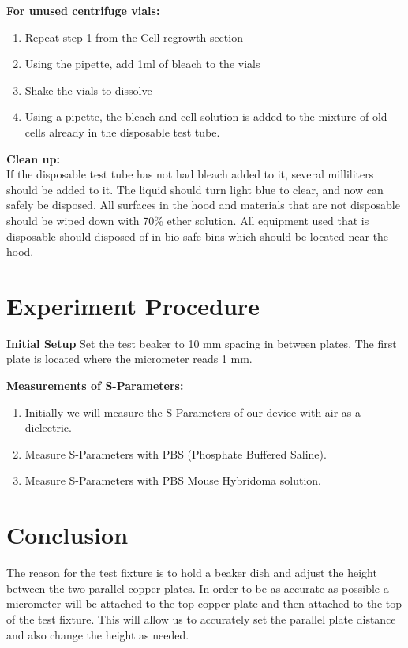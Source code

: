 \documentclass[journal]{IEEEtran}
\begin{document}
\textbf{For unused centrifuge vials:}
\begin{enumerate}
\item Repeat step 1 from the Cell regrowth section
\item Using the pipette, add 1ml of bleach to the vials
\item Shake the vials to dissolve
\item Using a pipette, the bleach and cell solution is added to the mixture of old cells already in the disposable test tube. 
\end{enumerate}

\textbf{Clean up:} \\
If the disposable test tube has not had bleach added to it, several milliliters should be added to it. The liquid should turn light blue to clear, and now can safely be disposed. All surfaces in the hood and materials that are not disposable should be wiped down with 70\% ether solution. All equipment used that is disposable should disposed of in bio-safe bins which should be located near the hood. 

\section{Experiment Procedure}

\textbf{Initial Setup}
Set the test beaker to 10 mm spacing in between plates. The first plate is located where the micrometer reads 1 mm.

\textbf{Measurements of S-Parameters:}
\begin{enumerate}
	\item Initially we will measure the S-Parameters of our device with air as a dielectric.
	\item Measure S-Parameters with PBS (Phosphate Buffered Saline).
	\item Measure S-Parameters with PBS Mouse Hybridoma solution.
\end{enumerate}

\section{Conclusion}
The reason for the test fixture is to hold a beaker dish and
  adjust the height between the two parallel copper plates. In order to be as accurate as possible a micrometer will be attached to the top copper plate and then attached to the top of the test fixture. This will allow us to accurately set the parallel plate distance and also change the height as needed. 
\end{document}
